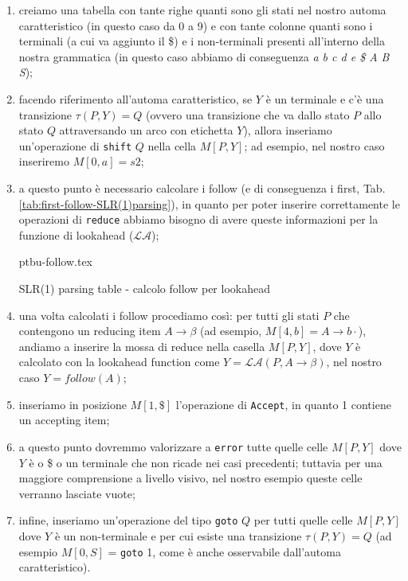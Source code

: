 \documentclass[class=book, crop=false, oneside, 12pt]{standalone}
\begin{document}
\begin{enumerate}
    \item creiamo una tabella con tante righe quanti sono gli stati nel nostro automa caratteristico (in questo caso da 0 a 9) e con tante colonne quanti sono i terminali (a cui va aggiunto il \$) e i non-terminali presenti all'interno della nostra grammatica (in questo caso abbiamo di conseguenza \emph{a b c d e \$ A B S});
    \item facendo riferimento all'automa caratteristico, se \(Y\) è un terminale e c'è una transizione \(\tau (P, Y) = Q\) (ovvero una transizione che va dallo stato \(P\) allo stato \(Q\) attraversando un arco con etichetta \(Y\)), allora inseriamo un'operazione di \texttt{shift} \(Q\) nella cella \(M[P, Y]\); ad esempio, nel nostro caso inseriremo \(M[0, a] = s2\);
    \item a questo punto è necessario calcolare i follow (e di conseguenza i first, Tab.\ref{tab:first-follow-SLR(1)parsing}), in quanto per poter inserire correttamente le operazioni di \texttt{reduce} abbiamo bisogno di avere queste informazioni per la funzione di lookahead (\(\mathcal{LA}\));
    \begin{table}[H]
        \centering
        {ptbu-follow.tex}
        \caption{SLR(1) parsing table - calcolo follow per lookahead}
        \label{tab:first-follow-SLR(1)parsing}
    \end{table}
    \item una volta calcolati i follow procediamo così: per tutti gli stati \(P\) che contengono un reducing item \(A \to \beta\) (ad esempio, \(M[4, b] = A \rightarrow b\cdot\)), andiamo a inserire la mossa di reduce nella casella \(M[P, Y]\), dove \(Y\) è calcolato con la lookahead function come \(Y = \mathcal{LA}(P, A \to \beta)\), nel nostro caso \(Y = follow(A)\); 
    \item inseriamo in posizione \(M[1, \$]\) l'operazione di \texttt{Accept}, in quanto 1 contiene un accepting item;
    \item a questo punto dovremmo valorizzare a \texttt{error} tutte quelle celle \(M[P, Y]\) dove \(Y\) è o \$ o un terminale che non ricade nei casi precedenti; tuttavia per una maggiore comprensione a livello visivo, nel nostro esempio queste celle verranno lasciate vuote;
    \item infine, inseriamo un'operazione del tipo \texttt{goto} \(Q\) per tutti quelle celle \(M[P, Y]\) dove \(Y\) è un non-terminale e per cui esiste una transizione \(\tau(P, Y) = Q\) (ad esempio \(M[0, S]\) = \texttt{goto} 1, come è anche osservabile dall'automa caratteristico).
\end{enumerate}
\end{document}

